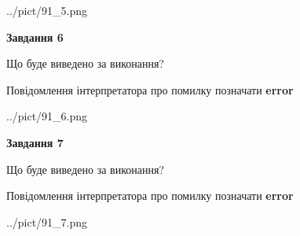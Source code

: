 \documentclass[10pt, ukrainian]{article}
\begin{document}
{\begin {large}
\begin{center}
	{../pict/91_5.png}
\end{center}
\newpage

{\begin {center}\textbf{Завдання 6}\end {center}}\par
Що буде виведено за виконання? \par
Повідомлення інтерпретатора про помилку позначати \textbf{error}

\begin{center}
	{../pict/91_6.png}
\end{center}
\newpage

{\begin {center}\textbf{Завдання 7}\end {center}}\par
Що буде виведено за виконання? \par
Повідомлення інтерпретатора про помилку позначати \textbf{error}

\begin{center}
	{../pict/91_7.png}
\end{center}
\newpage

\end {large}}
\end{document}
